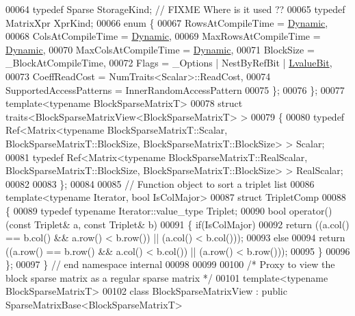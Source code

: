 \begin{DoxyCode}
00064   \textcolor{keyword}{typedef} Sparse StorageKind; \textcolor{comment}{// FIXME Where is it used ??}
00065   \textcolor{keyword}{typedef} MatrixXpr XprKind;
00066   \textcolor{keyword}{enum} \{
00067     RowsAtCompileTime = \hyperlink{namespace_eigen_ad81fa7195215a0ce30017dfac309f0b2}{Dynamic},
00068     ColsAtCompileTime = \hyperlink{namespace_eigen_ad81fa7195215a0ce30017dfac309f0b2}{Dynamic},
00069     MaxRowsAtCompileTime = \hyperlink{namespace_eigen_ad81fa7195215a0ce30017dfac309f0b2}{Dynamic},
00070     MaxColsAtCompileTime = \hyperlink{namespace_eigen_ad81fa7195215a0ce30017dfac309f0b2}{Dynamic},
00071     BlockSize = \_BlockAtCompileTime,
00072     Flags = \_Options | NestByRefBit | \hyperlink{group__flags_gae2c323957f20dfdc6cb8f44428eaec1a}{LvalueBit},
00073     CoeffReadCost = NumTraits<Scalar>::ReadCost,
00074     SupportedAccessPatterns = InnerRandomAccessPattern
00075   \};
00076 \};
00077 \textcolor{keyword}{template}<\textcolor{keyword}{typename} BlockSparseMatrixT>
00078 \textcolor{keyword}{struct }traits<BlockSparseMatrixView<BlockSparseMatrixT> >
00079 \{
00080   \textcolor{keyword}{typedef} Ref<Matrix<typename BlockSparseMatrixT::Scalar, BlockSparseMatrixT::BlockSize,
       BlockSparseMatrixT::BlockSize> > Scalar;
00081   \textcolor{keyword}{typedef} Ref<Matrix<typename BlockSparseMatrixT::RealScalar, BlockSparseMatrixT::BlockSize,
       BlockSparseMatrixT::BlockSize> > RealScalar;
00082 
00083 \};
00084 
00085 \textcolor{comment}{// Function object to sort a triplet list}
00086 \textcolor{keyword}{template}<\textcolor{keyword}{typename} Iterator, \textcolor{keywordtype}{bool} IsColMajor>
00087 \textcolor{keyword}{struct }TripletComp
00088 \{
00089   \textcolor{keyword}{typedef} \textcolor{keyword}{typename} Iterator::value\_type Triplet;
00090   \textcolor{keywordtype}{bool} operator()(\textcolor{keyword}{const} Triplet& a, \textcolor{keyword}{const} Triplet& b)
00091   \{ \textcolor{keywordflow}{if}(IsColMajor)
00092       \textcolor{keywordflow}{return} ((a.col() == b.col() && a.row() < b.row()) || (a.col() < b.col()));
00093     \textcolor{keywordflow}{else}
00094       \textcolor{keywordflow}{return} ((a.row() == b.row() && a.col() < b.col()) || (a.row() < b.row()));
00095   \}
00096 \};
00097 \} \textcolor{comment}{// end namespace internal}
00098 
00099 
00100 \textcolor{comment}{/* Proxy to view the block sparse matrix as a regular sparse matrix */}
00101 \textcolor{keyword}{template}<\textcolor{keyword}{typename} BlockSparseMatrixT>
00102 \textcolor{keyword}{class }BlockSparseMatrixView : \textcolor{keyword}{public} SparseMatrixBase<BlockSparseMatrixT>

\end{DoxyCode}
